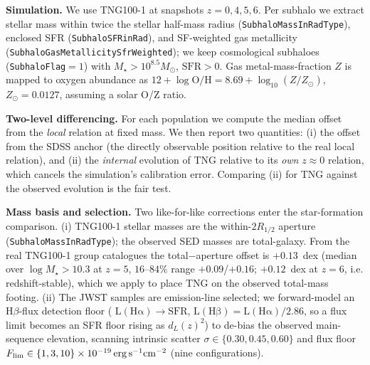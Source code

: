 \documentclass[twocolumn]{aastex631}
\begin{document}
\textbf{Simulation.} We use TNG100-1 \citep{nelson19} at snapshots $z=0,4,5,6$. Per subhalo we extract stellar mass within twice the stellar half-mass radius (\texttt{SubhaloMassInRadType}), enclosed SFR (\texttt{SubhaloSFRinRad}), and SF-weighted gas metallicity (\texttt{SubhaloGasMetallicitySfrWeighted}); we keep cosmological subhaloes (\texttt{SubhaloFlag}$=1$) with $M_\star>10^{8.5}M_\odot$, $\mathrm{SFR}>0$. Gas metal-mass-fraction $Z$ is mapped to oxygen abundance as $12+\log\mathrm{O/H}=8.69+\log_{10}(Z/Z_\odot)$, $Z_\odot=0.0127$, assuming a solar O/Z ratio.

\textbf{Two-level differencing.} For each population we compute the median offset from the \emph{local} relation at fixed mass. We then report two quantities: (i) the offset from the SDSS anchor (the directly observable position relative to the real local relation), and (ii) the \emph{internal} evolution of TNG relative to its \emph{own} $z\approx0$ relation, which cancels the simulation's calibration error. Comparing (ii) for TNG against the observed evolution is the fair test.

\textbf{Mass basis and selection.} Two like-for-like corrections enter the star-formation comparison. (i) TNG100-1 stellar masses are the within-$2R_{1/2}$ aperture (\texttt{SubhaloMassInRadType}); the observed SED masses are total-galaxy. From the real TNG100-1 group catalogues the total$-$aperture offset is $+0.13$~dex (median over $\log M_\star>10.3$ at $z=5$, $16$--$84\%$ range $+0.09$/$+0.16$; $+0.12$~dex at $z=6$, i.e. redshift-stable), which we apply to place TNG on the observed total-mass footing. (ii) The JWST samples are emission-line selected; we forward-model an $\mathrm{H}\beta$-flux detection floor (\citet{kennicutt98} $\mathrm{L(H\alpha)}\!\to\!\mathrm{SFR}$, $\mathrm{L(H\beta)}=\mathrm{L(H\alpha)}/2.86$, so a flux limit becomes an SFR floor rising as $d_L(z)^2$) to de-bias the observed main-sequence elevation, scanning intrinsic scatter $\sigma\in\{0.30,0.45,0.60\}$ and flux floor $F_{\rm lim}\in\{1,3,10\}\times10^{-19}\,\mathrm{erg\,s^{-1}cm^{-2}}$ (nine configurations).
\end{document}
